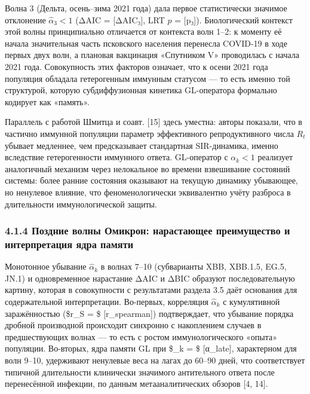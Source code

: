 \documentclass[12pt]{article}
\begin{document}
Волна 3 (Дельта, осень--зима 2021 года) дала первое статистически
значимое отклонение \(\hat{\alpha}_3 < 1\) (ΔAIC = {[}ΔAIC₃{]}, LRT
\(p\) = {[}p₃{]}). Биологический контекст этой волны принципиально
отличается от контекста волн 1--2: к моменту её начала значительная
часть псковского населения перенесла COVID-19 в ходе первых двух волн, а
плановая вакцинация «Спутником V» проводилась с начала 2021 года.
Совокупность этих факторов означает, что к осени 2021 года популяция
обладала гетерогенным иммунным статусом --- то есть именно той
структурой, которую субдиффузионная кинетика GL-оператора формально
кодирует как «память».

Параллель с работой Шмитца и соавт. {[}15{]} здесь уместна: авторы
показали, что в частично иммунной популяции параметр эффективного
репродуктивного числа \(R_t\) убывает медленнее, чем предсказывает
стандартная SIR-динамика, именно вследствие гетерогенности иммунного
ответа. GL-оператор с \(\alpha_k < 1\) реализует аналогичный механизм
через нелокальное во времени взвешивание состояний системы: более ранние
состояния оказывают на текущую динамику убывающее, но ненулевое влияние,
что феноменологически эквивалентно учёту разброса в длительности
иммунологической защиты.

\subsubsection{4.1.4 Поздние волны Омикрон: нарастающее преимущество и
интерпретация ядра
памяти}\label{ux43fux43eux437ux434ux43dux438ux435-ux432ux43eux43bux43dux44b-ux43eux43cux438ux43aux440ux43eux43d-ux43dux430ux440ux430ux441ux442ux430ux44eux449ux435ux435-ux43fux440ux435ux438ux43cux443ux449ux435ux441ux442ux432ux43e-ux438-ux438ux43dux442ux435ux440ux43fux440ux435ux442ux430ux446ux438ux44f-ux44fux434ux440ux430-ux43fux430ux43cux44fux442ux438}

Монотонное убывание \(\hat{\alpha}_k\) в волнах 7--10 (субварианты XBB,
XBB.1.5, EG.5, JN.1) и одновременное нарастание ΔAIC и ΔBIC образуют
последовательную картину, которая в совокупности с результатами раздела
3.5 даёт основания для содержательной интерпретации. Во-первых,
корреляция \(\hat{\alpha}_k\) с кумулятивной заражённостью (\$r\_S = \$
{[}r\_spearman{]}) подтверждает, что убывание порядка дробной
производной происходит синхронно с накоплением случаев в предшествующих
волнах --- то есть с ростом иммунологического «опыта» популяции.
Во-вторых, ядра памяти GL при \$\hat{\alpha}\_k = \$ {[}α\_late{]},
характерном для волн 9--10, удерживают ненулевые веса на лагах до 60--90
дней, что соответствует типичной длительности клинически значимого
антительного ответа после перенесённой инфекции, по данным
метааналитических обзоров {[}4, 14{]}.
\end{document}
